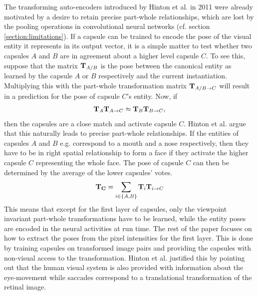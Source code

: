 The transforming auto-encoders introduced by Hinton et al. in 2011 were already motivated by a desire to retain precise part-whole relationships, which are lost by the pooling operations in convolutional neural networks (cf. section \ref{section:limitations}). If a capsule can be trained to encode the pose of the visual entity it represents in its output vector, it is a simple matter to test whether two capsules $A$ and $B$ are in agreement about a higher level capsule $C$. To see this, suppose that the matrix $\vb{T}_{A/B}$ is the pose between the canonical entity as learned by the capsule $A$ or $B$ respectively and the current instantiation. Multiplying this with the part-whole transformation matrix $\vb{T}_{A/B\rightarrow C}$ will result in a prediction for the pose of capsule $C$'s entity. Now, if
\begin{align}
    \vb{T}_A\vb{T}_{A\rightarrow C} \approx \vb{T}_B\vb{T}_{B\rightarrow C},
\end{align}
then the capsules are a close match and activate capsule $C$. Hinton et al. argue that this naturally leads to precise part-whole relationships. If the entities of capsules $A$ and $B$ e.g. correspond to a mouth and a nose respectively, then they have to be in right spatial relationship to form a face if they activate the higher capsule $C$ representing the whole face. The pose of capsule $C$ can then be determined by the average of the lower capsules' votes.
\begin{align}
    \vb{T_C} = \sum_{i\in \{A, B\}} \vb{T}_i\vb{T}_{i\rightarrow C}
\end{align}
This means that except for the first layer of capsules, only the viewpoint invariant part-whole transformations have to be learned, while the entity poses are encoded in the neural activities at run time. The rest of the paper focuses on how to extract the poses from the pixel intensities for the first layer. This is done by training capsules on transformed image pairs and providing the capsules with non-visual access to the transformation. Hinton et al. justified this by pointing out that the human visual system is also provided with information about the eye-movement while saccades correspond to a translational transformation of the retinal image.
